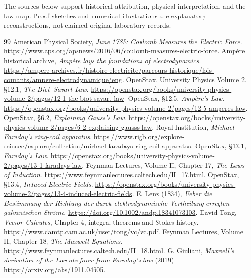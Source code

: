 \documentclass[11pt,letterpaper]{article}
\begin{document}
\newpage
The sources below support historical attribution, physical interpretation, and the law map. Proof sketches and numerical illustrations are explanatory reconstructions, not claimed original laboratory records.
\begin{thebibliography}{99}\small
{} American Physical Society, \emph{June 1785: Coulomb Measures the Electric Force}. \url{https://www.aps.org/apsnews/2016/06/coulomb-measures-electric-force}.
 Amp\`ere historical archive, \emph{Amp\`ere lays the foundations of electrodynamics}. \url{https://ampere-archives.fr/histoire-electricite/parcours-historique/lois-courants/ampere-electrodynamique/eng}.
 OpenStax, University Physics Volume 2, \S12.1, \emph{The Biot--Savart Law}. \url{https://openstax.org/books/university-physics-volume-2/pages/12-1-the-biot-savart-law}.
 OpenStax, \S12.5, \emph{Amp\`ere's Law}. \url{https://openstax.org/books/university-physics-volume-2/pages/12-5-amperes-law}.
 OpenStax, \S6.2, \emph{Explaining Gauss's Law}. \url{https://openstax.org/books/university-physics-volume-2/pages/6-2-explaining-gausss-law}.
 Royal Institution, \emph{Michael Faraday's ring-coil apparatus}. \url{https://www.rigb.org/explore-science/explore/collection/michael-faradays-ring-coil-apparatus}.
 OpenStax, \S13.1, \emph{Faraday's Law}. \url{https://openstax.org/books/university-physics-volume-2/pages/13-1-faradays-law}.
 Feynman Lectures, Volume II, Chapter 17, \emph{The Laws of Induction}. \url{https://www.feynmanlectures.caltech.edu/II_17.html}.
 OpenStax, \S13.4, \emph{Induced Electric Fields}. \url{https://openstax.org/books/university-physics-volume-2/pages/13-4-induced-electric-fields}.
 E. Lenz (1834), \emph{Ueber die Bestimmung der Richtung der durch elektrodynamische Vertheilung erregten galvanischen Str\"ome}. \url{https://doi.org/10.1002/andp.18341073103}.
 David Tong, \emph{Vector Calculus}, Chapter 4, integral theorems and Stokes history. \url{https://www.damtp.cam.ac.uk/user/tong/vc/vc.pdf}.
 Feynman Lectures, Volume II, Chapter 18, \emph{The Maxwell Equations}. \url{https://www.feynmanlectures.caltech.edu/II_18.html}.
 G. Giuliani, \emph{Maxwell's derivation of the Lorentz force from Faraday's law} (2019). \url{https://arxiv.org/abs/1911.04605}.
\end{thebibliography}
\end{document}
